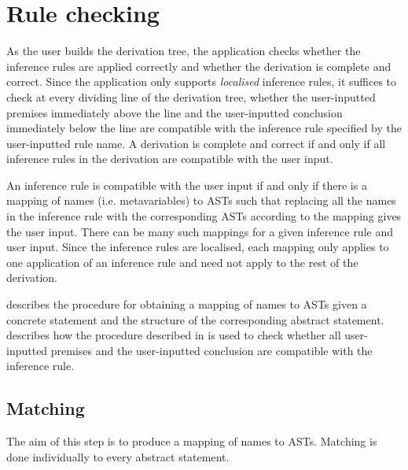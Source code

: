 \chapter{Rule checking}
\label{chapter:checking}
As the user builds the derivation tree, the application checks whether the inference rules are applied correctly and whether the derivation is complete and correct. Since the application only supports \textit{localised} inference rules, it suffices to check at every dividing line of the derivation tree, whether the user-inputted premises immediately above the line and the user-inputted conclusion immediately below the line are compatible with the inference rule specified by the user-inputted rule name. A derivation is complete and correct if and only if all inference rules in the derivation are compatible with the user input.

An inference rule is compatible with the user input if and only if there is a mapping of names (i.e. metavariables) to ASTs such that replacing all the names in the inference rule with the corresponding ASTs according to the mapping gives the user input. There can be many such mappings for a given inference rule and user input. Since the inference rules are localised, each mapping only applies to one application of an inference rule and need not apply to the rest of the derivation.

 describes the procedure for obtaining a mapping of names to ASTs given a concrete statement and the structure of the corresponding abstract statement.  describes how the procedure described in  is used to check whether all user-inputted premises and the user-inputted conclusion are compatible with the inference rule.

\section{Matching}
\label{checking:matching}
The aim of this step is to produce a mapping of names to ASTs. Matching is done individually to every abstract statement.

